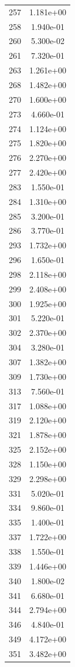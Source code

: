 \documentclass[12pt]{article}
\begin{document}
\begin{longtable}{@{}cc@{}}
257 & 1.181e+00 \\
258 & 1.940e-01 \\
260 & 5.300e-02 \\
261 & 7.320e-01 \\
263 & 1.261e+00 \\
268 & 1.482e+00 \\
270 & 1.600e+00 \\
273 & 4.660e-01 \\
274 & 1.124e+00 \\
275 & 1.820e+00 \\
276 & 2.270e+00 \\
277 & 2.420e+00 \\
283 & 1.550e-01 \\
284 & 1.310e+00 \\
285 & 3.200e-01 \\
286 & 3.770e-01 \\
293 & 1.732e+00 \\
296 & 1.650e-01 \\
298 & 2.118e+00 \\
299 & 2.408e+00 \\
300 & 1.925e+00 \\
301 & 5.220e-01 \\
302 & 2.370e+00 \\
304 & 3.280e-01 \\
307 & 1.382e+00 \\
309 & 1.730e+00 \\
313 & 7.560e-01 \\
317 & 1.088e+00 \\
319 & 2.120e+00 \\
321 & 1.878e+00 \\
325 & 2.152e+00 \\
328 & 1.150e+00 \\
329 & 2.298e+00 \\
331 & 5.020e-01 \\
334 & 9.860e-01 \\
335 & 1.400e-01 \\
337 & 1.722e+00 \\
338 & 1.550e-01 \\
339 & 1.446e+00 \\
340 & 1.800e-02 \\
341 & 6.680e-01 \\
344 & 2.794e+00 \\
346 & 4.840e-01 \\
349 & 4.172e+00 \\
351 & 3.482e+00 \\

\end{longtable}
\end{document}
